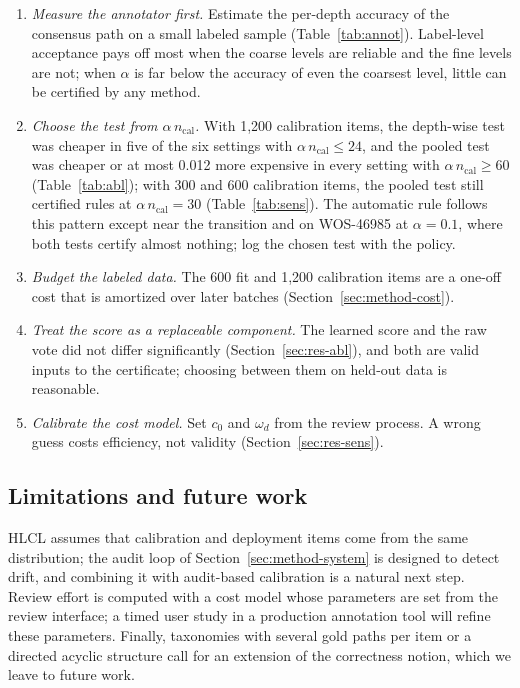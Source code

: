 \documentclass[preprint,12pt]{elsarticle}
\theoremstyle{definition}
\newcommand{\hlcl}{\textup{\textsc{HLCL}}}
\begin{document}
\begin{enumerate}
  \item \emph{Measure the annotator first.} Estimate the per-depth accuracy of
  the consensus path on a small labeled sample (Table~\ref{tab:annot}).
  Label-level acceptance pays off most when the coarse levels are reliable and
  the fine levels are not; when $\alpha$ is far below the accuracy of even the
  coarsest level, little can be certified by any method.
  \item \emph{Choose the test from $\alpha\,n_{\mathrm{cal}}$.} With 1,200
  calibration items, the depth-wise test was cheaper in five of the six settings
  with $\alpha\,n_{\mathrm{cal}}\le24$, and
  the pooled test was cheaper or at most 0.012 more expensive in every setting
  with $\alpha\,n_{\mathrm{cal}}\ge60$ (Table~\ref{tab:abl}); with 300 and 600
  calibration items, the pooled test still certified rules at
  $\alpha\,n_{\mathrm{cal}}=30$ (Table~\ref{tab:sens}). The automatic rule
  follows this pattern except near the transition and on WOS-46985 at
  $\alpha=0.1$, where both tests certify almost nothing; log the chosen test
  with the policy.
  \item \emph{Budget the labeled data.} The 600 fit and 1,200 calibration items
  are a one-off cost that is amortized over later batches
  (Section~\ref{sec:method-cost}).
  \item \emph{Treat the score as a replaceable component.} The learned score
  and the raw vote did not differ significantly (Section~\ref{sec:res-abl}), and
  both are valid inputs to the certificate; choosing between them on held-out
  data is reasonable.
  \item \emph{Calibrate the cost model.} Set $c_0$ and $\omega_d$ from the
  review process. A wrong guess costs efficiency, not validity
  (Section~\ref{sec:res-sens}).
\end{enumerate}

\subsection{Limitations and future work}
\label{sec:disc-limits}
\hlcl{} assumes that calibration and deployment items come from the same
distribution; the audit loop of Section~\ref{sec:method-system} is designed to
detect drift, and combining it with audit-based calibration
\citep{zhang2026cared} is a natural next step. Review effort is computed with a
cost model whose parameters
are set from the review interface; a timed user study in a production
annotation tool will refine these parameters. Finally, taxonomies with several
gold paths per item or a directed acyclic structure call for an extension of
the correctness notion, which we leave to future work.
\end{document}
